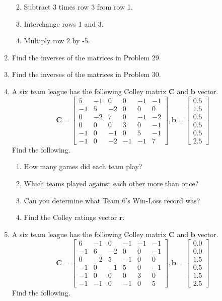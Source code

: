 \documentclass[
]{book}
\providecommand{\tightlist}{%
  \setlength{\itemsep}{0pt}\setlength{\parskip}{0pt}}
\theoremstyle{definition}
\theoremstyle{definition}
\theoremstyle{definition}
\theoremstyle{definition}
\theoremstyle{remark}
\begin{document}
\begin{enumerate}
  \begin{enumerate}
  \def\labelenumii{\alph{enumii}.}
  \tightlist
  \item
    Subtract 3 times row 3 from row 1.
  \item
    Interchange rows 1 and 3.
  \item
    Multiply row 2 by -5.
  \end{enumerate}
\item
  Find the inverses of the matrices in Problem 29.
\item
  Find the inverses of the matrices in Problem 30.
\item
  A six team league has the following Colley matrix \(\mathbf{C}\) and \(\mathbf{b}\) vector.
  \[\mathbf{C}=\begin{bmatrix}
    5 & -1 & 0 & 0 & -1 & -1 \\ 
    -1 & 5 & -2 & 0 & 0 & 0 \\ 
    0 & -2 & 7 & 0 & -1 & -2 \\ 
    0 & 0 & 0 & 3 & 0 & -1 \\ 
    -1 & 0 & -1 & 0 & 5 & -1 \\ 
    -1 & 0 & -2 & -1 & -1 & 7\end{bmatrix},\mathbf{b}=\begin{bmatrix} 0.5\\1.5\\0.5\\0.5\\0.5\\2.5\end{bmatrix}\]
  Find the following.

  \begin{enumerate}
  \def\labelenumii{\alph{enumii}.}
  \tightlist
  \item
    How many games did each team play?
  \item
    Which teams played against each other more than once?
  \item
    Can you determine what Team 6's Win-Loss record was?
  \item
    Find the Colley ratings vector \(\mathbf{r}\).
  \end{enumerate}
\item
  A six team league has the following Colley matrix \(\mathbf{C}\) and \(\mathbf{b}\) vector.
  \[\mathbf{C}=\begin{bmatrix}
    6 & -1 & 0 & -1 & -1 & -1 \\ 
    -1 & 6 & -2 & 0 & 0 & -1 \\ 
    0 & -2 & 5 & -1 & 0 & 0 \\ 
    -1 & 0 & -1 & 5 & 0 & -1 \\ 
    -1 & 0 & 0 & 0 & 3 & 0 \\ 
    -1 & -1 & 0 & -1 & 0 & 5\end{bmatrix},\mathbf{b}=\begin{bmatrix} 0.0\\0.0\\1.5\\0.5\\1.5\\2.5\end{bmatrix}\]
  Find the following.


\end{enumerate}
\end{document}
